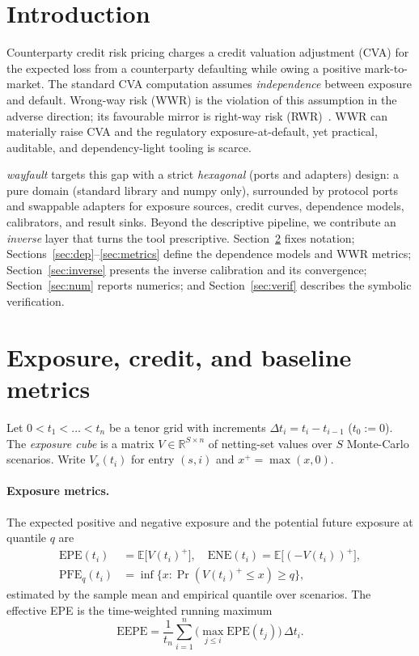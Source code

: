 \documentclass[12pt]{article}
\newcommand{\E}{\mathbb{E}}
\newcommand{\EPE}{\mathrm{EPE}}
\newcommand{\ENE}{\mathrm{ENE}}
\newcommand{\PFE}{\mathrm{PFE}}
\newcommand{\EEPE}{\mathrm{EEPE}}
\begin{document}
\vspace{1.0em}

\section{Introduction}
Counterparty credit risk pricing charges a credit valuation adjustment (CVA)
for the expected loss from a counterparty defaulting while owing a positive
mark-to-market. The standard CVA computation assumes \emph{independence} between
exposure and default. Wrong-way risk (WWR) is the violation of this assumption
in the adverse direction; its favourable mirror is right-way risk
(RWR)~\citep{hullwhite2012,gregory}. WWR can materially raise CVA and the
regulatory exposure-at-default, yet practical, auditable, and dependency-light
tooling is scarce.

\emph{wayfault} targets this gap with a strict \emph{hexagonal} (ports and
adapters) design: a pure domain (standard library and numpy only), surrounded by
protocol ports and swappable adapters for exposure sources, credit curves,
dependence models, calibrators, and result sinks. Beyond the descriptive
pipeline, we contribute an \emph{inverse} layer that turns the tool
prescriptive. Section~\ref{sec:model} fixes notation;
Sections~\ref{sec:dep}--\ref{sec:metrics} define the dependence models and WWR
metrics; Section~\ref{sec:inverse} presents the inverse calibration and its
convergence; Section~\ref{sec:num} reports numerics; and Section~\ref{sec:verif}
describes the symbolic verification.

\section{Exposure, credit, and baseline metrics}\label{sec:model}
Let $0<t_1<\dots<t_n$ be a tenor grid with increments
$\Delta t_i=t_i-t_{i-1}$ ($t_0:=0$). The \emph{exposure cube} is a matrix
$V\in\mathbb{R}^{S\times n}$ of netting-set values over $S$ Monte-Carlo
scenarios. Write $V_s(t_i)$ for entry $(s,i)$ and $x^{+}=\max(x,0)$.

\paragraph{Exposure metrics.} The expected positive and negative exposure and
the potential future exposure at quantile $q$ are
\begin{align}
\EPE(t_i) &= \E\!\big[V(t_i)^{+}\big],\quad
\ENE(t_i) = \E\!\big[(-V(t_i))^{+}\big],\\
\PFE_q(t_i) &= \inf\{x:\Pr(V(t_i)^{+}\le x)\ge q\},
\end{align}
estimated by the sample mean and empirical quantile over scenarios. The
effective EPE is the time-weighted running maximum
\begin{equation}
\EEPE = \frac{1}{t_n}\sum_{i=1}^{n}\Big(\max_{j\le i}\EPE(t_j)\Big)\,\Delta t_i .
\end{equation}
\end{document}
